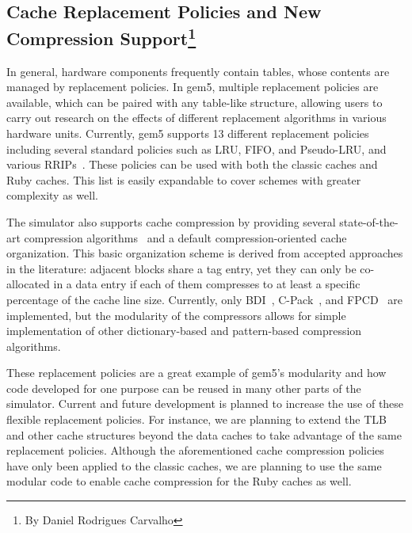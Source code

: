 \subsection[Cache Replacement Policies and New Compression Support]{Cache Replacement Policies and New Compression Support\footnote{By Daniel Rodrigues Carvalho}}
\label{sec:replacement}

In general, hardware components frequently contain tables, whose contents are managed by replacement policies.
In gem5, multiple replacement policies are available, which can be paired with any table-like structure, allowing users to carry out research on the effects of different replacement algorithms in various hardware units.
Currently, gem5 supports 13 different replacement policies including several standard policies such as LRU, FIFO, and Pseudo-LRU, and various RRIPs~\cite{Jaleel2010rrip}.
These policies can be used with both the classic caches and Ruby caches.
This list is easily expandable to cover schemes with greater complexity as well.

The simulator also supports cache compression by providing several state-of-the-art compression algorithms~\cite{sardashti2015primer} and a default compression-oriented cache organization.
This basic organization scheme is derived from accepted approaches in the literature: adjacent blocks share a tag entry, yet they can only be co-allocated in a data entry if each of them compresses to at least a specific percentage of the cache line size.
Currently, only BDI~\cite{pekhimenko2012base}, C-Pack~\cite{chen2010c}, and FPCD~\cite{alameldeen2018opportunistic} are implemented, but the modularity of the compressors allows for simple implementation of other dictionary-based and pattern-based compression algorithms.

These replacement policies are a great example of gem5's modularity and how code developed for one purpose can be reused in many other parts of the simulator.
Current and future development is planned to increase the use of these flexible replacement policies.
For instance, we are planning to extend the TLB and other cache structures beyond the data caches to take advantage of the same replacement policies.
Although the aforementioned cache compression policies have only been applied to the classic caches, we are planning to use the same modular code to enable cache compression for the Ruby caches as well.
